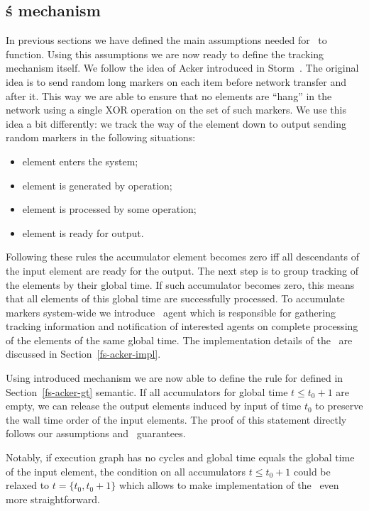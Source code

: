 \subsection{\tracker\'s mechanism}
In previous sections we have defined the main assumptions needed for \tracker\ to function. Using this assumptions we are now ready to define the tracking mechanism itself. We follow the idea of Acker introduced in Storm~\cite{Toshniwal:2014:STO:2588555.2595641}. The original idea is to send random long markers on each item before network transfer and after it. This way we are able to ensure that no elements are ``hang'' in the network using a single XOR operation on the set of such markers. We use this idea a bit differently: we track the way of the element down to output sending random markers in the following situations:
\begin{itemize}
    \item element enters the system;
    \item element is generated by operation;
    \item element is processed by some operation;
    \item element is ready for output.
\end{itemize}
Following these rules the accumulator element becomes zero iff all descendants of the input element are ready for the output. The next step is to group tracking of the elements by their global time. If such accumulator becomes zero, this means that all elements of this global time are successfully processed. To accumulate markers system-wide we introduce \tracker\ agent which is responsible for gathering tracking information and notification of interested agents on complete processing of the elements of the same global time. The implementation details of the \tracker\ are discussed in Section~\ref{fs-acker-impl}.

Using introduced mechanism we are now able to define the rule for defined in Section~\ref{fs-acker-gt} semantic. If all accumulators for global time $t \le t_0 + 1$ are empty, we can release the output elements induced by input of time $t_0$ to preserve the wall time order of the input elements. The proof of this statement directly follows our assumptions and \tracker\ guarantees.

Notably, if execution graph has no cycles and global time equals the global time of the input element, the condition on all accumulators $t \le t_0 + 1$ could be relaxed to $t = \{t_0, t_0 + 1\}$ which allows to make implementation of the \tracker\ even more straightforward.

